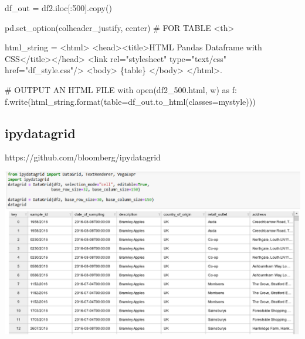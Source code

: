 \documentclass[
  letterpaper,
  DIV=11,
  numbers=noendperiod]{scrartcl}
\newenvironment{Shaded}{\begin{snugshade}}{\end{snugshade}}
\newcommand{\BuiltInTok}[1]{\textcolor[rgb]{0.00,0.23,0.31}{#1}}
\newcommand{\CommentTok}[1]{\textcolor[rgb]{0.37,0.37,0.37}{#1}}
\newcommand{\ControlFlowTok}[1]{\textcolor[rgb]{0.00,0.23,0.31}{#1}}
\newcommand{\DecValTok}[1]{\textcolor[rgb]{0.68,0.00,0.00}{#1}}
\newcommand{\ImportTok}[1]{\textcolor[rgb]{0.00,0.46,0.62}{#1}}
\newcommand{\NormalTok}[1]{\textcolor[rgb]{0.00,0.23,0.31}{#1}}
\newcommand{\OperatorTok}[1]{\textcolor[rgb]{0.37,0.37,0.37}{#1}}
\newcommand{\SpecialCharTok}[1]{\textcolor[rgb]{0.37,0.37,0.37}{#1}}
\newcommand{\StringTok}[1]{\textcolor[rgb]{0.13,0.47,0.30}{#1}}
\begin{document}
\begin{Shaded}
\begin{Highlighting}[]
\NormalTok{df\_out }\OperatorTok{=}\NormalTok{ df2.iloc[:}\DecValTok{500}\NormalTok{].copy()}

\NormalTok{pd.set\_option(}\StringTok{\textquotesingle{}colheader\_justify\textquotesingle{}}\NormalTok{, }\StringTok{\textquotesingle{}center\textquotesingle{}}\NormalTok{)   }\CommentTok{\# FOR TABLE \textless{}th\textgreater{}}

\NormalTok{html\_string }\OperatorTok{=} \StringTok{\textquotesingle{}\textquotesingle{}\textquotesingle{}}
\StringTok{\textless{}html\textgreater{}}
\StringTok{  \textless{}head\textgreater{}\textless{}title\textgreater{}HTML Pandas Dataframe with CSS\textless{}/title\textgreater{}\textless{}/head\textgreater{}}
\StringTok{  \textless{}link rel="stylesheet" type="text/css" href="df\_style.css"/\textgreater{}}
\StringTok{  \textless{}body\textgreater{}}
\StringTok{    }\SpecialCharTok{\{table\}}
\StringTok{  \textless{}/body\textgreater{}}
\StringTok{\textless{}/html\textgreater{}.}
\StringTok{\textquotesingle{}\textquotesingle{}\textquotesingle{}}

\CommentTok{\# OUTPUT AN HTML FILE}
\ControlFlowTok{with} \BuiltInTok{open}\NormalTok{(}\StringTok{\textquotesingle{}df2\_500.html\textquotesingle{}}\NormalTok{, }\StringTok{\textquotesingle{}w\textquotesingle{}}\NormalTok{) }\ImportTok{as}\NormalTok{ f:}
\NormalTok{    f.write(html\_string.}\BuiltInTok{format}\NormalTok{(table}\OperatorTok{=}\NormalTok{df\_out.to\_html(classes}\OperatorTok{=}\StringTok{\textquotesingle{}mystyle\textquotesingle{}}\NormalTok{)))}
\end{Highlighting}
\end{Shaded}

\hypertarget{ipydatagrid}{%
\subsection{ipydatagrid}\label{ipydatagrid}}

https://github.com/bloomberg/ipydatagrid

\includegraphics{ghtop_images/ipydatagrid.png}
\end{document}
